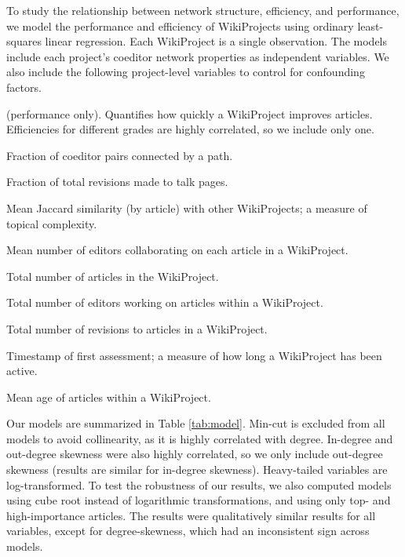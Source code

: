 \documentclass[letterpaper,twocolumn,10pt]{article}
\newcommand{\+}{\phantom{-}}
\begin{document}
To study the relationship between network structure, efficiency, and performance,
we model the performance and efficiency of WikiProjects using ordinary least-squares linear regression.
Each WikiProject is a single observation.
The models include each project's coeditor network properties as independent variables.
We also include the following project-level variables to control for confounding factors.
\begin{description}
\setlength\itemsep{0pt}
\item[C-efficiency]
(performance only).
Quantifies how quickly a WikiProject improves articles.
Efficiencies for different grades are highly correlated,
so we include only one.
\item[Connected fraction.]
Fraction of coeditor pairs connected by a path.
\item[Talk fraction.] Fraction of total revisions made to talk pages.
\item[Mean similarity.] Mean Jaccard similarity (by article) with other WikiProjects; a measure of topical complexity.
\item[Mean editors/article.] Mean number of editors collaborating on each article in a WikiProject.
\item[Article count.] Total number of articles in the WikiProject.
\item[Editor count.] Total number of editors working on articles within a WikiProject.
\item[Revision count.] Total number of revisions to articles in a WikiProject.
\item[First assessment.] Timestamp of first assessment; a measure of how long a WikiProject has been active.
\item[Mean article age.] Mean age of articles within a WikiProject.
\end{description}

Our models are summarized in Table \ref{tab:model}.
Min-cut is excluded from all models to avoid collinearity,
as it is highly correlated with degree.
In-degree and out-degree skewness were also highly correlated,
so we only include out-degree skewness
(results are similar for in-degree skewness).
Heavy-tailed variables are log-transformed.
To test the robustness of our results,
we also computed models using cube root instead of logarithmic transformations,
and using only top- and high-importance articles.
The results were qualitatively similar results for all variables,
except for degree-skewness, which had an inconsistent sign across models.
\end{document}
